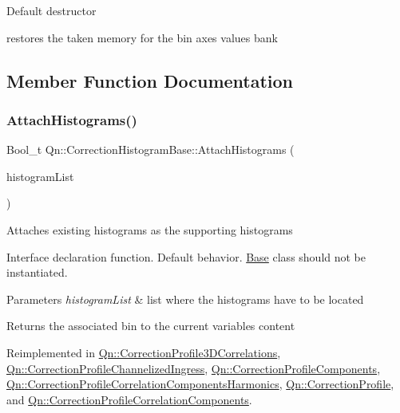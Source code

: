Default destructor

restores the taken memory for the bin axes values bank 

\subsection{Member Function Documentation}
\mbox{\label{classQn_1_1CorrectionHistogramBase_ad8bcd0079fe5db561780a522e46b7b16}} 
\subsubsection{\texorpdfstring{Attach\+Histograms()}{AttachHistograms()}\hspace{0.1cm}{\footnotesize\ttfamily [1/2]}}
{\footnotesize\ttfamily Bool\+\_\+t Qn\+::\+Correction\+Histogram\+Base\+::\+Attach\+Histograms (\begin{DoxyParamCaption}\item[{T\+List $\ast$}]{histogram\+List }\end{DoxyParamCaption})\hspace{0.3cm}{\ttfamily [virtual]}}

Attaches existing histograms as the supporting histograms

Interface declaration function. Default behavior. \mbox{\hyperlink{classBase}{Base}} class should not be instantiated.


\begin{DoxyParams}{Parameters}
{\em histogram\+List} & list where the histograms have to be located \\
\hline
\end{DoxyParams}
\begin{DoxyReturn}{Returns}
the associated bin to the current variables content 
\end{DoxyReturn}


Reimplemented in \mbox{\hyperlink{classQn_1_1CorrectionProfile3DCorrelations_a6d6a1895f3362cd539f0249ad42d8b9c}{Qn\+::\+Correction\+Profile3\+D\+Correlations}}, \mbox{\hyperlink{classQn_1_1CorrectionProfileChannelizedIngress_a98ef1bc824701a5e2eb5deb20a6c524f}{Qn\+::\+Correction\+Profile\+Channelized\+Ingress}}, \mbox{\hyperlink{classQn_1_1CorrectionProfileComponents_adefa34cb026125ea0d52966c470f81af}{Qn\+::\+Correction\+Profile\+Components}}, \mbox{\hyperlink{classQn_1_1CorrectionProfileCorrelationComponentsHarmonics_ab338a5263d8eb124c3a6a0bbde5f72e3}{Qn\+::\+Correction\+Profile\+Correlation\+Components\+Harmonics}}, \mbox{\hyperlink{classQn_1_1CorrectionProfile_a679319b8518152cf5563a87d77d87f2e}{Qn\+::\+Correction\+Profile}}, and \mbox{\hyperlink{classQn_1_1CorrectionProfileCorrelationComponents_af2faa01d08373d0cb2e5631776729989}{Qn\+::\+Correction\+Profile\+Correlation\+Components}}.

